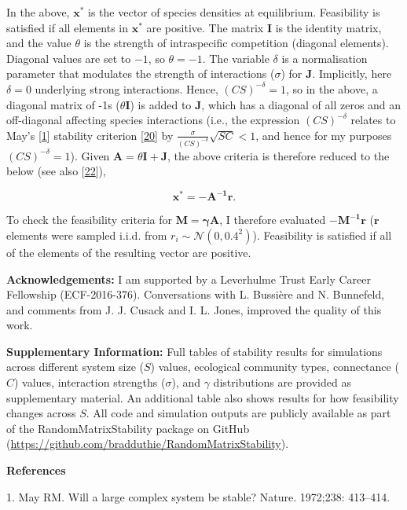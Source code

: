 \documentclass[]{article}
\begin{document}
In the above, \(\mathbf{x^{*}}\) is the vector of species densities at
equilibrium. Feasibility is satisfied if all elements in
\(\mathbf{x^{*}}\) are positive. The matrix \(\mathbf{I}\) is the
identity matrix, and the value \(\theta\) is the strength of
intraspecific competition (diagonal elements). Diagonal values are set
to \(-1\), so \(\theta = -1\). The variable \(\delta\) is a
normalisation parameter that modulates the strength of interactions
(\(\sigma\)) for \(\mathbf{J}\). Implicitly, here \(\delta = 0\)
underlying strong interactions. Hence, \((CS)^{-\delta} = 1\), so in the
above, a diagonal matrix of -1s (\(\theta \mathbf{I}\)) is added to
\(\mathbf{J}\), which has a diagonal of all zeros and an off-diagonal
affecting species interactions (i.e., the expression \((CS)^{-\delta}\)
relates to May's {[}\protect\hyperlink{ref-May1972}{1}{]} stability
criterion {[}\protect\hyperlink{ref-Dougoud2018}{20}{]} by
\(\frac{\sigma}{(CS)^{-\delta}}\sqrt{SC} < 1\), and hence for my
purposes \((CS)^{-\delta} = 1\)). Given
\(\mathbf{A} = \theta\mathbf{I + J}\), the above criteria is therefore
reduced to the below (see also
{[}\protect\hyperlink{ref-Servan2018}{22}{]}),

\[\mathbf{x^{*} = -A^{-1}r}.\]

To check the feasibility criteria for \(\mathbf{M = \gamma A}\), I
therefore evaluated \(\mathbf{-M^{-1}r}\) (\(\mathbf{r}\) elements were
sampled i.i.d. from \(r_{i} \sim \mathcal{N}(0, 0.4^{2})\)). Feasibility
is satisfied if all of the elements of the resulting vector are
positive.

\textbf{Acknowledgements:} I am supported by a Leverhulme Trust Early
Career Fellowship (ECF-2016-376). Conversations with L. Bussière and N.
Bunnefeld, and comments from J. J. Cusack and I. L. Jones, improved the
quality of this work.

\textbf{Supplementary Information:} Full tables of stability results for
simulations across different system size (\(S\)) values, ecological
community types, connectance (\(C\)) values, interaction strengths
(\(\sigma\)), and \(\gamma\) distributions are provided as supplementary
material. An additional table also shows results for how feasibility
changes across \(S\). All code and simulation outputs are publicly
available as part of the RandomMatrixStability package on GitHub
(\url{https://github.com/bradduthie/RandomMatrixStability}).

\textbf{References}

\hypertarget{refs}{}
\hypertarget{ref-May1972}{}
1. May RM. Will a large complex system be stable? Nature. 1972;238:
413--414.
\end{document}
